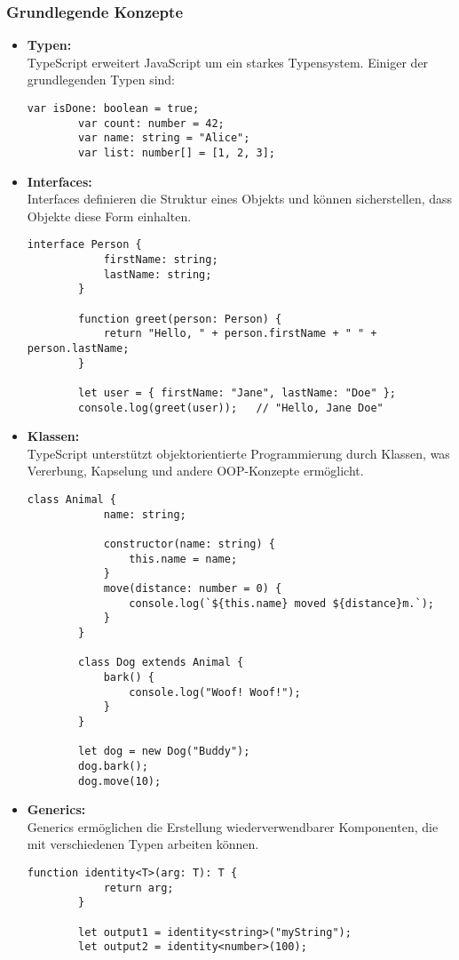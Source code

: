 \subsubsection[Grundlegende Konzepte]{Grundlegende Konzepte}
\begin{itemize}
    \item \textbf{Typen:} \\
     TypeScript erweitert JavaScript um ein starkes Typensystem. Einiger der grundlegenden Typen sind:
     \begin{lstlisting}[caption={Beispiel: Typen in TypeScript}]
        var isDone: boolean = true;
        var count: number = 42;
        var name: string = "Alice";
        var list: number[] = [1, 2, 3];
     \end{lstlisting}
    \item \textbf{Interfaces:} \\
    Interfaces definieren die Struktur eines Objekts und können sicherstellen, dass Objekte diese Form einhalten.
    \begin{lstlisting}[caption={Beispiel: Interfaces in TypeScript}]
        interface Person {
            firstName: string;
            lastName: string;
        }

        function greet(person: Person) {
            return "Hello, " + person.firstName + " " + person.lastName;
        }

        let user = { firstName: "Jane", lastName: "Doe" };
        console.log(greet(user));   // "Hello, Jane Doe"
    \end{lstlisting}
    \item \textbf{Klassen:} \\
    TypeScript unterstützt objektorientierte Programmierung durch Klassen, was Vererbung, Kapselung und andere OOP-Konzepte ermöglicht.
    \begin{lstlisting}[caption={Beispiel: Klassen in TypeScript}]
        class Animal {
            name: string;

            constructor(name: string) {
                this.name = name;
            }
            move(distance: number = 0) {
                console.log(`${this.name} moved ${distance}m.`);
            }
        }

        class Dog extends Animal {
            bark() {
                console.log("Woof! Woof!");
            }
        }

        let dog = new Dog("Buddy");
        dog.bark();
        dog.move(10);
    \end{lstlisting}
    \item \textbf{Generics:} \\
    Generics ermöglichen die Erstellung wiederverwendbarer Komponenten, die mit verschiedenen Typen arbeiten können.
    \begin{lstlisting}[caption={Beispiel: Generics in TypeScript}]
        function identity<T>(arg: T): T {
            return arg;
        }

        let output1 = identity<string>("myString");
        let output2 = identity<number>(100);
    \end{lstlisting}
\end{itemize}

